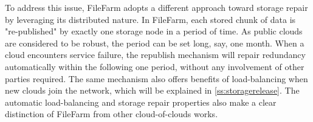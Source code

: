 To address this issue, FileFarm adopts a different approach toward storage repair by leveraging its distributed nature. In FileFarm, each stored chunk of data is "re-published" by exactly one storage node in a period of time. As public clouds are considered to be robust, the period can be set long, say, one month. When a cloud encounters service failure, the republish mechanism will repair redundancy automatically within the following one period, without any involvement of other parties required. The same mechanism also offers benefits of load-balancing when new clouds join the network, which will be explained in \ref{ss:storagerelease}. The automatic load-balancing and storage repair properties also make a clear distinction of FileFarm from other cloud-of-clouds works.












